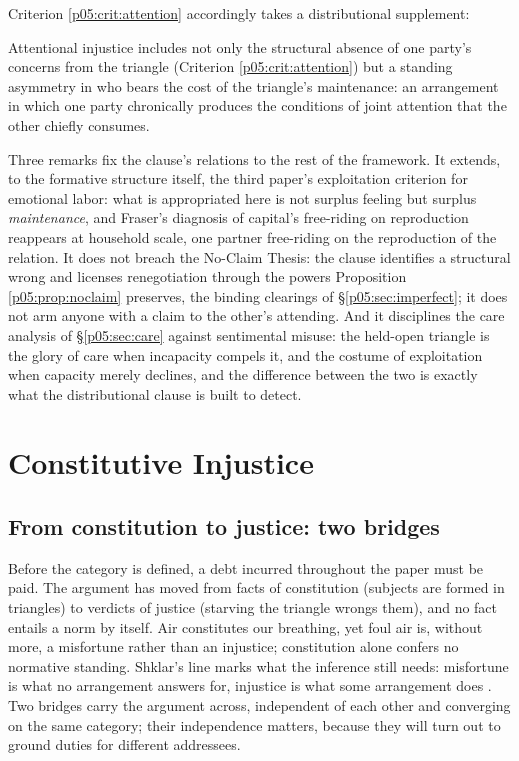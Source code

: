 Criterion \ref{p05:crit:attention} accordingly takes a distributional supplement:

\begin{crit}\label{p05:crit:distribution}
Attentional injustice includes not only the structural absence of one party's concerns from the triangle (Criterion \ref{p05:crit:attention}) but a standing asymmetry in who bears the cost of the triangle's maintenance: an arrangement in which one party chronically produces the conditions of joint attention that the other chiefly consumes.
\end{crit}

Three remarks fix the clause's relations to the rest of the framework. It extends, to the formative structure itself, the third paper's exploitation criterion for emotional labor: what is appropriated here is not surplus feeling but surplus \emph{maintenance}, and Fraser's diagnosis of capital's free-riding on reproduction \parencite{fraser2016} reappears at household scale, one partner free-riding on the reproduction of the relation. It does not breach the No-Claim Thesis: the clause identifies a structural wrong and licenses renegotiation through the powers Proposition \ref{p05:prop:noclaim} preserves, the binding clearings of §\ref{p05:sec:imperfect}; it does not arm anyone with a claim to the other's attending. And it disciplines the care analysis of §\ref{p05:sec:care} against sentimental misuse: the held-open triangle is the glory of care when incapacity compels it, and the costume of exploitation when capacity merely declines, and the difference between the two is exactly what the distributional clause is built to detect.

\section{Constitutive Injustice}
\label{p05:sec:constitutive}

\subsection{From constitution to justice: two bridges}
\label{p05:sec:bridge}

Before the category is defined, a debt incurred throughout the paper must be paid. The argument has moved from facts of constitution (subjects are formed in triangles) to verdicts of justice (starving the triangle wrongs them), and no fact entails a norm by itself. Air constitutes our breathing, yet foul air is, without more, a misfortune rather than an injustice; constitution alone confers no normative standing. Shklar's line marks what the inference still needs: misfortune is what no arrangement answers for, injustice is what some arrangement does \parencite{shklar1990}. Two bridges carry the argument across, independent of each other and converging on the same category; their independence matters, because they will turn out to ground duties for different addressees.

